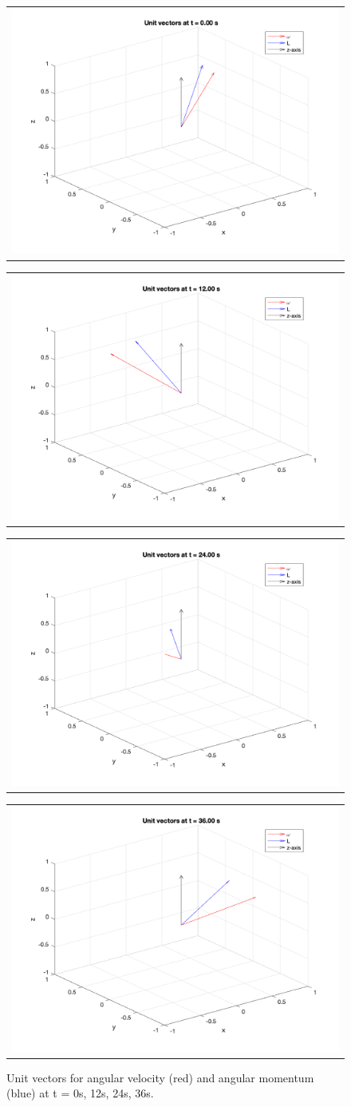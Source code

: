 \begin{figure}[H]
  \centering
  \begin{tabular}{@{}c@{}}
  \includegraphics[width=.47\linewidth]{Images/ps3_problem3_vectors_1.png}
  \end{tabular}
  \begin{tabular}{@{}c@{}}
  \includegraphics[width=.47\linewidth]{Images/ps3_problem3_vectors_121.png}
  \end{tabular}
  \begin{tabular}{@{}c@{}}
  \includegraphics[width=.47\linewidth]{Images/ps3_problem3_vectors_241.png}
  \end{tabular}
  \begin{tabular}{@{}c@{}}
  \includegraphics[width=.47\linewidth]{Images/ps3_problem3_vectors_361.png}
  \end{tabular}
  \caption{Unit vectors for angular velocity (red) and angular momentum (blue) at t = 0s, 12s, 24s, 36s.}
  \label{fig:Body Axis Momentum Snapshots}
\end{figure}


